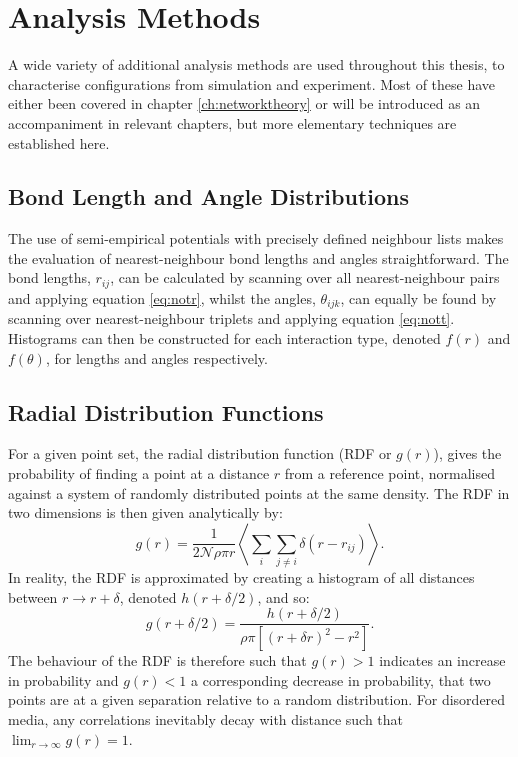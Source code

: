 \section{Analysis Methods}

A wide variety of additional analysis methods are used throughout this thesis, to characterise configurations from simulation and experiment.
Most of these have either been covered in chapter \ref{ch:networktheory} or will be introduced as an accompaniment in relevant chapters, but more elementary techniques are established here.

\subsection{Bond Length and Angle Distributions}

The use of semi\--empirical potentials with precisely defined neighbour lists makes the evaluation of nearest\--neighbour bond lengths and angles straightforward.
The bond lengths, $r_{ij}$, can be calculated by scanning over all nearest\--neighbour pairs and applying equation \eqref{eq:notr},
whilst the angles, $\theta_{ijk}$, can equally be found by scanning over nearest\--neighbour triplets and applying equation \eqref{eq:nott}.
Histograms can then be constructed for each interaction type, denoted $f\left(r\right)$ and $f\left(\theta\right)$, for lengths and angles respectively.

\subsection{Radial Distribution Functions}
\label{s:rdfs}

For a given point set, the radial distribution function (RDF or $g\left(r\right)$), gives the probability of finding a point at a distance $r$ from a reference point, normalised against a system of randomly distributed points at the same density.  
The RDF in two dimensions is then given analytically by:
\begin{equation}
	g\left(r\right)=\frac{1}{2 \mathcal{N} \rho \pi r}\left\langle \sum_i \sum_{j\neq i} \delta\left(r-r_{ij}\right)\right\rangle. 
\end{equation} 
In reality, the RDF is approximated by creating a histogram of all distances between $r \rightarrow r+\delta$, denoted $h\left(r+\delta/2\right)$, and so:
\begin{equation}
	g\left(r+\delta/2\right) = \frac{h\left(r+\delta/2\right)}{\rho\pi\left[\left(r+\delta r\right)^2-r^2\right]}.
\end{equation}
The behaviour of the RDF is therefore such that $g\left(r\right)>1$ indicates an increase in probability and $g\left(r\right)<1$ a corresponding decrease in probability, that two points are at a given separation relative to a random distribution.
For disordered media, any correlations inevitably decay with distance such that $\lim_{r\rightarrow \infty} g\left(r\right)=1$.

